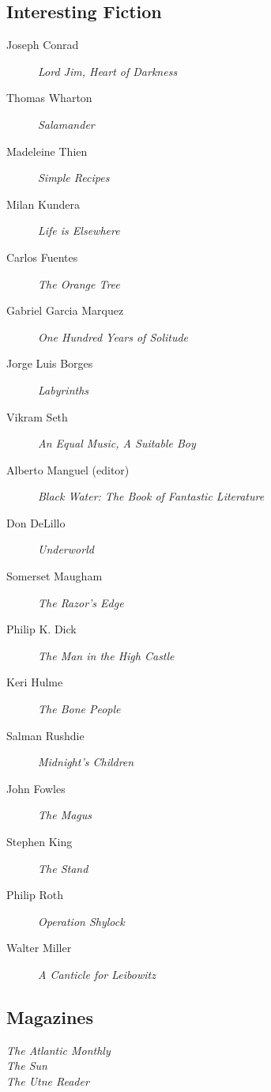 \documentclass[letterpaper,10pt,headsepline]{scrreprt}
\begin{document}
\subsection{Interesting Fiction}
\begin{description}
\item [Joseph Conrad] \textit{Lord Jim, Heart of Darkness\/}
\item [Thomas Wharton] \textit{Salamander\/}
\item [Madeleine Thien] \textit{Simple Recipes\/}
\item [Milan Kundera] \textit{Life is Elsewhere\/}
\item [Carlos Fuentes] \textit{The Orange Tree\/}
\item [Gabriel Garcia Marquez] \textit{One Hundred Years of Solitude\/}
\item [Jorge Luis Borges] \textit{Labyrinths\/}
\item [Vikram Seth] \textit{An Equal Music, A Suitable Boy\/}
\item [Alberto Manguel (editor)] \textit{Black Water: The Book of
    Fantastic Literature\/}
\item [Don DeLillo] \textit{Underworld\/}
\item [Somerset Maugham] \textit{The Razor's Edge\/}
\item [Philip K. Dick] \textit{The Man in the High Castle\/}
\item [Keri Hulme] \textit{The Bone People\/}
\item [Salman Rushdie] \textit{Midnight's Children\/}
\item [John Fowles] \textit{The Magus\/}
\item [Stephen King] \textit{The Stand\/}
\item [Philip Roth] \textit{Operation Shylock\/}
\item [Walter Miller] \textit{A Canticle for Leibowitz\/}
\end{description}

\subsection{Magazines}
\textit{The Atlantic Monthly\\
The Sun\\
The Utne Reader\/}
\end{document}
